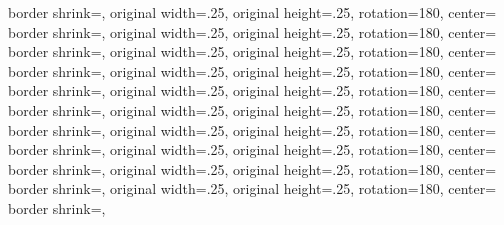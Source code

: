 {  {%
	border shrink=\pgfpageoptionborder,%
	original width=.25\pgfpageoptionheight,%
	original height=.25\pgfpageoptionwidth,%
	rotation=180,%
	center=\pgfpoint{0.75\pgfphysicalwidth}{.75\pgfphysicalheight}%
	}%
  {%
	border shrink=\pgfpageoptionborder,%
	original width=.25\pgfpageoptionheight,%
	original height=.25\pgfpageoptionwidth,%
	rotation=180,%
	center=\pgfpoint{0.5\pgfphysicalwidth}{.75\pgfphysicalheight}%
  }%
  {%
	border shrink=\pgfpageoptionborder,%
	original width=.25\pgfpageoptionheight,%
	original height=.25\pgfpageoptionwidth,%
	rotation=180,%
	center=\pgfpoint{0.25\pgfphysicalwidth}{.75\pgfphysicalheight}%
  }%
  {%
	border shrink=\pgfpageoptionborder,%
	original width=.25\pgfpageoptionheight,%
	original height=.25\pgfpageoptionwidth,%
	rotation=180,%
	center=\pgfpoint{1\pgfphysicalwidth}{.5\pgfphysicalheight}%
  }%
  {%
	border shrink=\pgfpageoptionborder,%
	original width=.25\pgfpageoptionheight,%
	original height=.25\pgfpageoptionwidth,%
	rotation=180,%
	center=\pgfpoint{0.75\pgfphysicalwidth}{.5\pgfphysicalheight}%
  }%
  {%
	border shrink=\pgfpageoptionborder,%
	original width=.25\pgfpageoptionheight,%
	original height=.25\pgfpageoptionwidth,%
	rotation=180,%
	center=\pgfpoint{0.5\pgfphysicalwidth}{.5\pgfphysicalheight}%
  }%
  {%
	border shrink=\pgfpageoptionborder,%
	original width=.25\pgfpageoptionheight,%
	original height=.25\pgfpageoptionwidth,%
	rotation=180,%
	center=\pgfpoint{0.25\pgfphysicalwidth}{.5\pgfphysicalheight}%
  }%
  {%
	border shrink=\pgfpageoptionborder,%
	original width=.25\pgfpageoptionheight,%
	original height=.25\pgfpageoptionwidth,%
	rotation=180,%
	center=\pgfpoint{1\pgfphysicalwidth}{.25\pgfphysicalheight}%
  }%
  {%
	border shrink=\pgfpageoptionborder,%
	original width=.25\pgfpageoptionheight,%
	original height=.25\pgfpageoptionwidth,%
	rotation=180,%
	center=\pgfpoint{0.75\pgfphysicalwidth}{.25\pgfphysicalheight}%
  }%
  {%
	border shrink=\pgfpageoptionborder,%
	original width=.25\pgfpageoptionheight,%
	original height=.25\pgfpageoptionwidth,%
	rotation=180,%
	center=\pgfpoint{0.5\pgfphysicalwidth}{.25\pgfphysicalheight}%
  }%
  {%
	border shrink=\pgfpageoptionborder,%
}}
